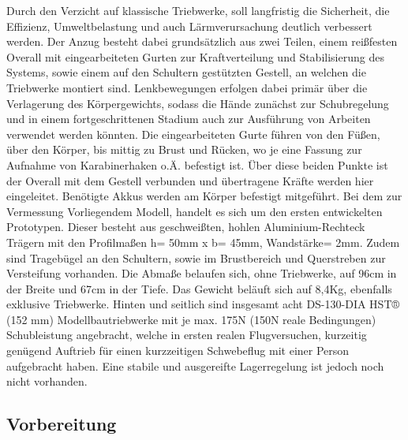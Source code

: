 Durch den Verzicht auf klassische Triebwerke, soll langfristig die Sicherheit, die Effizienz, Umweltbelastung und auch Lärmverursachung deutlich verbessert werden.
Der Anzug besteht dabei grundsätzlich aus zwei Teilen, einem reißfesten Overall mit eingearbeiteten Gurten zur Kraftverteilung und Stabilisierung des Systems,
sowie einem auf den Schultern gestützten Gestell, an welchen die Triebwerke montiert sind. Lenkbewegungen erfolgen dabei primär über die Verlagerung des Körpergewichts,
sodass die Hände zunächst zur Schubregelung und in einem fortgeschrittenen Stadium auch zur Ausführung von Arbeiten verwendet werden könnten.
Die eingearbeiteten Gurte führen von den Füßen, über den Körper, bis mittig zu Brust und Rücken, wo je eine Fassung zur Aufnahme von Karabinerhaken o.Ä. befestigt ist.
Über diese beiden Punkte ist der Overall mit dem Gestell verbunden und übertragene Kräfte werden hier eingeleitet. Benötigte Akkus werden am Körper befestigt mitgeführt. 
Bei dem zur Vermessung Vorliegendem Modell, handelt es sich um den ersten entwickelten Prototypen.
Dieser besteht aus geschweißten, hohlen Aluminium-Rechteck Trägern mit den Profilmaßen h= 50mm x b= 45mm, Wandstärke= 2mm.
Zudem sind Tragebügel an den Schultern, sowie im Brustbereich und Querstreben zur Versteifung vorhanden.
Die Abmaße belaufen sich, ohne Triebwerke, auf 96cm in der Breite und 67cm in der Tiefe. Das Gewicht beläuft sich auf 8,4Kg, ebenfalls exklusive Triebwerke.
Hinten und seitlich sind insgesamt acht DS-130-DIA HST® (152 mm) Modellbautriebwerke mit je max. 175N (150N reale Bedingungen) Schubleistung angebracht,
welche in ersten realen Flugversuchen, kurzeitig genügend Auftrieb für einen kurzzeitigen Schwebeflug mit einer Person aufgebracht haben.
Eine stabile und ausgereifte Lagerregelung ist jedoch noch nicht vorhanden.

\subsection{Vorbereitung}

